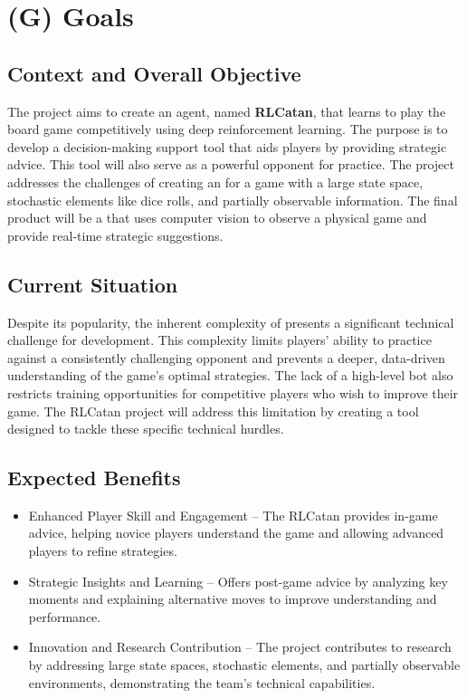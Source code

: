 \documentclass{article}
\begin{document}
\section*{(G) Goals}\label{sec:srs-goals}
\renewcommand{\thesubsection}{G.\arabic{subsection}}
\renewcommand{\theHsubsection}{G.\arabic{subsection}}
\setcounter{subsection}{0}

\subsection{Context and Overall Objective}\label{subsec:context-and-overall-objective}
The project aims to create an \AI{} agent, named \textbf{RLCatan}, that learns to play the board game \emph{\Catan{}} competitively using deep reinforcement learning. The purpose is to develop a decision-making support tool that aids players by providing strategic advice. This tool will also serve as a powerful \AI{} opponent for practice. The project addresses the challenges of creating an \AI{} for a game with a large state space, stochastic elements like dice rolls, and partially observable information. The final product will be a \DigitalTwin{} that uses computer vision to observe a physical game and provide real-time strategic suggestions.

\subsection{Current Situation}\label{subsec:current-situation}
Despite its popularity, the inherent complexity of \emph{\Catan{}} presents a significant technical challenge for \AI{} development. This complexity limits players' ability to practice against a consistently challenging opponent and prevents a deeper, data-driven understanding of the game's optimal strategies. The lack of a high-level \AI{} bot also restricts training opportunities for competitive players who wish to improve their game. The RLCatan project will address this limitation by creating a tool designed to tackle these specific technical hurdles.

\subsection{Expected Benefits}\label{subsec:expected-benefits}
\begin{itemize}
    \item {Enhanced Player Skill and Engagement} – The RLCatan \AI{} provides in-game advice, helping novice players understand the game and allowing advanced players to refine strategies.
    \item {Strategic Insights and Learning} – Offers post-game advice by analyzing key moments and explaining alternative moves to improve understanding and performance.
    \item {\AI{} Innovation and Research Contribution} – The project contributes to \AI{} research by addressing large state spaces, stochastic elements, and partially observable environments, demonstrating the team's technical capabilities.
\end{itemize}
\end{document}
